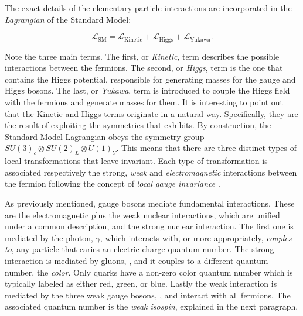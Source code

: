 
The exact details of the elementary particle interactions are incorporated in the
{\it Lagrangian} of the Standard Model:

\begin{equation}
\mathscr{L}_{\text{SM}} =
\mathscr{L}_{\text{Kinetic}} + \mathscr{L}_{\text{Higgs}} + \mathscr{L}_{\text{Yukawa}}.
\label{lagrangian}
\end{equation}

\noindent Note the three main terms. The first, or {\it Kinetic}, term describes the possible interactions between the fermions.
The second, or {\it Higgs}, term is the one that contains the Higgs potential, responsible for generating
masses for the gauge and Higgs bosons. The last, or {\it Yukawa}, term is introduced to
couple the Higgs field with the fermions and generate masses for them.
It is interesting to point out that the Kinetic and Higgs terms originate in a natural way.
Specifically, they are the result of exploiting the symmetries that  exhibits.
By construction, the Standard Model Lagrangian obeys the symmetry group $SU(3)_c\otimes SU(2)_L\otimes U(1)_Y$.
This means that there are three distinct types of local transformations that leave  invariant.
Each type of transformation is associated respectively the strong, {\it weak} and {\it electromagnetic} interactions
between the fermion following the concept of {\it local gauge invariance} \cite{aitchison,halzen1984quarks}.

As previously mentioned, gauge bosons mediate fundamental interactions. These are the electromagnetic
plus the weak nuclear interactions, which are unified under a common description, and the strong nuclear interaction.
The first one is mediated by the photon, $\gamma$, which interacts with, or more appropriately, {\it couples to}, any particle that
caries an electric charge quantum number. The strong interaction is mediated by gluons, \gluon,
and it couples to a different quantum number, the  {\it color}.
Only quarks have a non-zero color quantum number which is typically labeled as either red, green, or blue. Lastly the
weak interaction is mediated by the three weak gauge bosons, \Wpm, \Z and interact with all fermions.
The associated quantum number is the  {\it weak isospin}, explained in the next paragraph.

